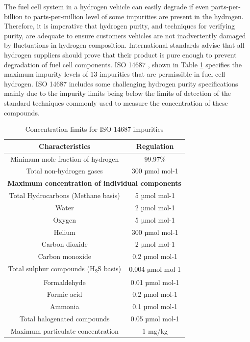 The fuel cell system in a hydrogen vehicle can easily degrade if even parts-per-billion to parts-per-million level of some impurities are present in the hydrogen. Therefore, it is imperative that hydrogen purity, and techniques for verifying purity, are adequate to ensure customers vehicles are not inadvertently damaged by fluctuations in hydrogen composition. International standards advise that all hydrogen suppliers should prove that their product is pure enough to prevent degradation of fuel cell components. ISO 14687 \cite{InternationalStandardISO14687-2:20122012}, shown in Table \ref{tab:1} specifies the maximum impurity levels of 13 impurities that are permissible in fuel cell hydrogen. ISO 14687 includes some challenging hydrogen purity specifications mainly due to the impurity limits being below the limits of detection of the standard techniques commonly used to measure the concentration of these compounds. 

\begin{table}[]
    \caption{Concentration limits for ISO-14687 impurities}
    \centering
    \begin{tabular}{@{}cc@{}}
    \toprule
    \textbf{Characteristics}                  & \textbf{Regulation}    \\ \midrule
    Minimum mole fraction of hydrogen         & 99.97\%                \\
    Total non-hydrogen gases                  & 300 µmol mol-1         \\ \midrule
    \multicolumn{2}{c}{\textbf{Maximum concentration of individual components}} \\ \midrule
    Total Hydrocarbons (Methane basis)        & 5 µmol mol-1           \\
    Water                                     & 2 µmol mol-1           \\
    Oxygen                                    & 5 µmol mol-1           \\
    Helium                                    & 300 µmol mol-1         \\
    Carbon dioxide                            & 2 µmol mol-1           \\
    Carbon monoxide                           & 0.2 µmol mol-1         \\
    Total sulphur compounds (H\textsubscript{2}S basis)       & 0.004 µmol mol-1       \\
    Formaldehyde                              & 0.01 µmol mol-1        \\
    Formic acid                               & 0.2 µmol mol-1         \\
    Ammonia                                   & 0.1 µmol mol-1         \\
    Total halogenated compounds               & 0.05 µmol mol-1        \\
    Maximum particulate concentration         & 1 mg/kg                \\ \bottomrule
    \end{tabular}
    \label{tab:1}
\end{table}

